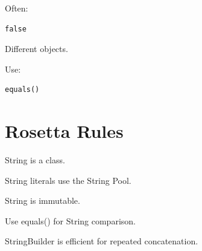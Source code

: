 \documentclass[11pt,a4paper]{book}
\begin{document}

Often:

\begin{verbatim}
false
\end{verbatim}


Different objects.


Use:

\begin{verbatim}
equals()
\end{verbatim}


\section{Rosetta Rules}

\begin{rosettarule}

String is a class.

\end{rosettarule}


\begin{rosettarule}

String literals use the String Pool.

\end{rosettarule}


\begin{rosettarule}

String is immutable.

\end{rosettarule}


\begin{rosettarule}

Use equals() for String comparison.

\end{rosettarule}


\begin{rosettarule}

StringBuilder is efficient for repeated concatenation.

\end{rosettarule}
\end{document}
